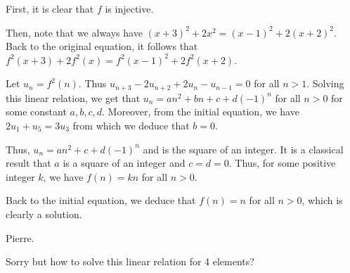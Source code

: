 \begin{solution}
	\begin{tcolorbox}First, it is clear that $ f$ is injective.

Then, note that we always have $ (x+3)^2 + 2x^2 = (x-1)^2 +2 (x+2)^2$. Back to the original equation, it follows that $ f^2(x+3) + 2f^2(x) = f^2(x-1)^2 +2f^2 (x+2)$.

Let $ u_n = f^2(n)$. Thus $ u_{n+3} - 2u_{n+2} + 2u_n - u_{n-1} = 0$ for all $ n>1$.
Solving this linear relation, we get that $ u_n = an^2 + bn + c + d(-1)^n$ for all $ n > 0$ for some constant $ a,b,c,d$.
Moreover, from the initial equation, we have $ 2u_1 + u_5 = 3u_3$ from which we deduce that $ b = 0$.

Thus, $ u_n = an^2  + c + d(-1)^n$ and is the square of an integer. It is a classical result that $ a$ is a square of an integer and $ c=d=0$.
Thus, for some positive integer $ k$, we have $ f(n) = kn$ for all $ n>0$.

Back to the initial equation, we deduce that $ f(n) = n$ for all $ n>0$, which is clearly a solution.

Pierre.\end{tcolorbox}


Sorry but how to solve this linear relation for 4 elements?
\end{solution}



